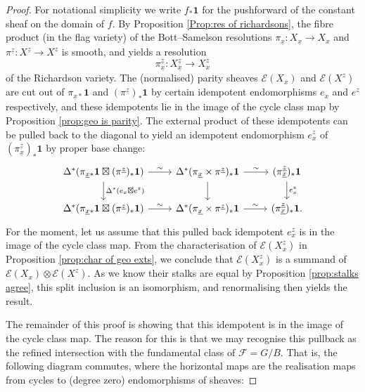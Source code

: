 \documentclass[11pt]{article}
\theoremstyle{remark}
\theoremstyle{definition}
\begin{document}
\begin{proof}
For notational simplicity we write $f_* \mathbf{1}$ for the pushforward of the constant sheaf on the domain of $f$.
By Proposition \ref{Prop:res of richardsons}, the fibre product (in the flag variety) of the Bott--Samelson resolutions $\pi_{\underline{x}}: X_{\underline{x}}\to X_x$ and $\pi^{\underline{z}}:X^{\underline{z}}\to X^z$ is smooth, and yields a resolution \[\pi_{\underline{x}}^{\underline{z}}:X^{\underline{z}}_{\underline{x}}\to X^z_x\] of the Richardson variety. 
The (normalised) parity sheaves $\mathscr{E}(X_x)$ and $\mathscr{E}(X^z)$ are cut out of $\pi_{\underline{x}*}\mathbf{1}$ and $(\pi^{\underline{z}})_{\ast}\mathbf{1}$ by certain idempotent endomorphisms $e_x$ and $e^z$ respectively, and these idempotents lie in the image of the cycle class map by Proposition \ref{prop:geo is parity}. The external product of these idempotents can be pulled back to the diagonal to yield an idempotent endomorphism $e_x^z$ of $(\pi_{\underline{x}}^{\underline{z}})_\ast\mathbf{1}$ by proper base change:
\[\begin{tikzcd}
    \Delta^*(\pi_{\underline{x}\ast}\mathbf{1}\boxtimes (\pi^{\underline{z}})_{*}\mathbf{1})\arrow[r,"\sim"]\arrow[d,"\Delta^*(e_x\boxtimes e^z)"]&\Delta^*(\pi_{\underline{x}}\times \pi^{\underline{z}})_*\mathbf{1}\arrow[d]\arrow[r,"\sim"]&(\pi_{\underline{x}}^{\underline{z}})_\ast\mathbf{1}\arrow[d,"e^z_x"]\\
    \Delta^*(\pi_{\underline{x}\ast}\mathbf{1}\boxtimes (\pi^{\underline{z}})_*\mathbf{1})\arrow[r,"\sim"]&\Delta^*(\pi_{\underline{x}}\times \pi^{\underline{z}})_*\mathbf{1}\arrow[r,"\sim"]&(\pi_{\underline{x}}^{\underline{z}})_\ast\mathbf{1}.
\end{tikzcd}\]
For the moment, let us assume that this pulled back idempotent $e^z_x$ is in the image of the cycle class map. From the characterisation of $\mathscr{E}(X^z_x)$ in Proposition \ref{prop:char of geo exts}, we conclude that $\mathscr{E}(X^z_x)$ is a summand of $\mathscr{E}(X_x)\otimes \mathscr{E}(X^z)$. As we know their stalks are equal by Proposition \ref{prop:stalks agree}, this split inclusion is an isomorphism, and renormalising then yields the result.
\\
\par
The remainder of this proof is showing that this idempotent is in the image of the cycle class map. The reason for this is that we may recognise this pullback as the refined intersection with the fundamental class of $\mathcal{F} = G/B$. That is, the following diagram commutes, where the horizontal maps are the realisation maps from cycles to (degree zero) endomorphisms of sheaves:

\end{proof}
\end{document}
